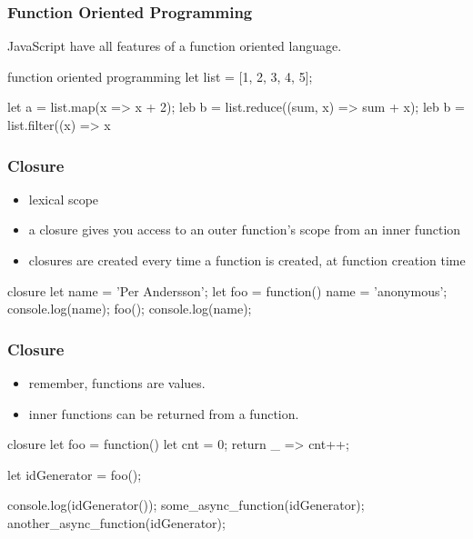 \begin{frame}[fragile] \frametitle{Function Oriented Programming}

JavaScript have all features of a function oriented language.
\vspace{8mm}

\begin{CodeBox}{function oriented programming}
let list = [1, 2, 3, 4, 5];

let a = list.map(x => x + 2);
leb b = list.reduce((sum, x) => sum + x);
leb b = list.filter((x) => x %
\end{CodeBox}
\end{frame}

\begin{frame}[fragile] \frametitle{Closure}

\begin{itemize}
  \item lexical scope
  \item a closure gives you access to an outer function’s scope from an inner function
  \item closures are created every time a function is created, at function creation time
\end{itemize}
\vspace{5mm}

\begin{CodeBox}{closure}
let name = 'Per Andersson';
let foo = function() {
  name = 'anonymous';
}
console.log(name);
foo();
console.log(name);
\end{CodeBox}
\end{frame}

\begin{frame}[fragile] \frametitle{Closure}

\begin{itemize}
  \item remember, functions are values.
  \item inner functions can be returned from a function.
\end{itemize}

\vspace{4mm}

\begin{CodeBox}{closure}
let foo = function() {
  let cnt = 0;
  return _ => cnt++;
}

let idGenerator = foo();

console.log(idGenerator());
some_async_function(idGenerator);
another_async_function(idGenerator);
\end{CodeBox}
\end{frame}

